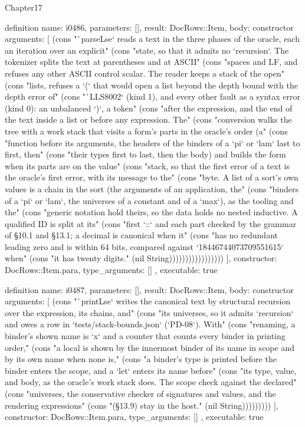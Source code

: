 \begin{lexlean}{Chapter17}
\begin{semanticmodule}
definition{
  name: i0486,
  parameters: [],
  result: DocRows::Item,
  body: constructor{
    arguments: [
      (cons "`parseLse` reads a text in the three phases of the oracle, each an iteration over an explicit" (cons "state, so that it admits no `recursion`. The tokenizer splits the text at parentheses and at ASCII" (cons "spaces and LF, and refuses any other ASCII control scalar. The reader keeps a stack of the open" (cons "lists, refuses a `(` that would open a list beyond the depth bound with the depth error of" (cons "`LLS8002` (kind 1), and every other fault as a syntax error (kind 0): an unbalanced `)`, a token" (cons "after the expression, and the end of the text inside a list or before any expression. The" (cons "conversion walks the tree with a work stack that visits a form's parts in the oracle's order (a" (cons "function before its arguments, the headers of the binders of a `pi` or `lam` last to first, then" (cons "their types first to last, then the body) and builds the form when its parts are on the value" (cons "stack, so that the first error of a text is the oracle's first error, with its message to the" (cons "byte. A list of a sort's own values is a chain in the sort (the arguments of an application, the" (cons "binders of a `pi` or `lam`, the universes of a constant and of a `max`), as the tooling and the" (cons "generic notation hold theirs, so the data holds no nested inductive. A qualified ID is split at its" (cons "first `::` and each part checked by the grammar of §10.1 and §13.1; a decimal is canonical when it" (cons "has no redundant leading zero and is within 64 bits, compared against `18446744073709551615` when" (cons "it has twenty digits." (nil String)))))))))))))))))
    ],
    constructor: DocRows::Item.para,
    type_arguments: []
  },
  executable: true
}

definition{
  name: i0487,
  parameters: [],
  result: DocRows::Item,
  body: constructor{
    arguments: [
      (cons "`printLse` writes the canonical text by structural recursion over the expression, its chains, and" (cons "its universes, so it admits `recursion` and owes a row in `tests/stack-bounds.json` (`PD-08`). With" (cons "renaming, a binder's shown name is `x` and a counter that counts every binder in printing order," (cons "a local is shown by the innermost binder of its name in scope and by its own name when none is," (cons "a binder's type is printed before the binder enters the scope, and a `let` enters its name before" (cons "its type, value, and body, as the oracle's work stack does. The scope check against the declared" (cons "universes, the conservative checker of signatures and values, and the rendering expressions" (cons "(§13.9) stay in the host." (nil String)))))))))
    ],
    constructor: DocRows::Item.para,
    type_arguments: []
  },
  executable: true
}


\end{semanticmodule}
\end{lexlean}
